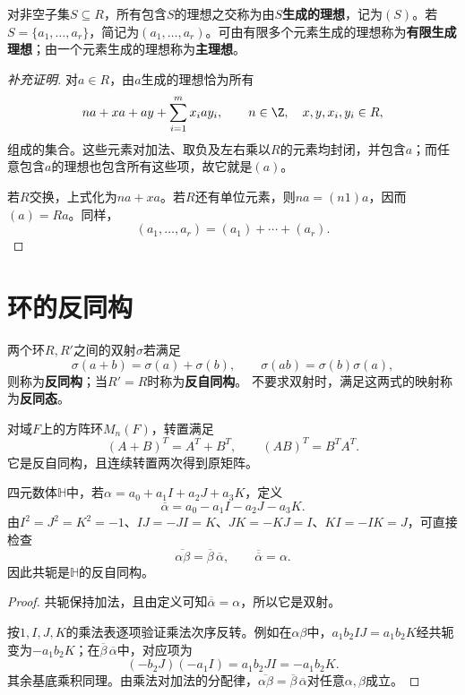 \begin{definition}
对非空子集$S\subseteq R$，所有包含$S$的理想之交称为由$S$\textbf{生成的理想}，记为$(S)$。若$S=\{a_1,\ldots,a_r\}$，简记为$(a_1,\ldots,a_r)$。可由有限多个元素生成的理想称为\textbf{有限生成理想}；由一个元素生成的理想称为\textbf{主理想}。
\end{definition}
\begin{proof}[补充证明]
对$a\in R$，由$a$生成的理想恰为所有
\[
na+xa+ay+\sum_{i=1}^m x_iay_i,
\qquad n\in\Z,\quad x,y,x_i,y_i\in R,
\]
组成的集合。这些元素对加法、取负及左右乘以$R$的元素均封闭，并包含$a$；而任意包含$a$的理想也包含所有这些项，故它就是$(a)$。

若$R$交换，上式化为$na+xa$。若$R$还有单位元素，则$na=(n1)a$，因而$(a)=Ra$。同样，
\[
(a_1,\ldots,a_r)=(a_1)+\cdots+(a_r).
\]
\end{proof}
\section{环的反同构}

\begin{definition}
两个环$R,R'$之间的双射$\sigma$若满足
\[
\sigma(a+b)=\sigma(a)+\sigma(b),\qquad
\sigma(ab)=\sigma(b)\sigma(a),
\]
则称为\textbf{反同构}；当$R'=R$时称为\textbf{反自同构}。
不要求双射时，满足这两式的映射称为\textbf{反同态}。
\end{definition}

\begin{example}
对域$F$上的方阵环$M_n(F)$，转置满足
\[
(A+B)^T=A^T+B^T,\qquad (AB)^T=B^TA^T.
\]
它是反自同构，且连续转置两次得到原矩阵。
\end{example}

\begin{example}
四元数体$\mathbb H$中，若$\alpha=a_0+a_1I+a_2J+a_3K$，定义
\[
\overline\alpha=a_0-a_1I-a_2J-a_3K.
\]
由$I^2=J^2=K^2=-1$、$IJ=-JI=K$、$JK=-KJ=I$、$KI=-IK=J$，可直接检查
\[
\overline{\alpha\beta}=\overline\beta\,\overline\alpha,
\qquad \overline{\overline\alpha}=\alpha.
\]
因此共轭是$\mathbb H$的反自同构。
\end{example}
\begin{proof}
共轭保持加法，且由定义可知$\overline{\overline\alpha}=\alpha$，所以它是双射。

按$1,I,J,K$的乘法表逐项验证乘法次序反转。例如在$\alpha\beta$中，$a_1b_2IJ=a_1b_2K$经共轭变为$-a_1b_2K$；在$\overline\beta\,\overline\alpha$中，对应项为
\[
(-b_2J)(-a_1I)=a_1b_2JI=-a_1b_2K.
\]
其余基底乘积同理。由乘法对加法的分配律，$\overline{\alpha\beta}=\overline\beta\,\overline\alpha$对任意$\alpha,\beta$成立。
\end{proof}

